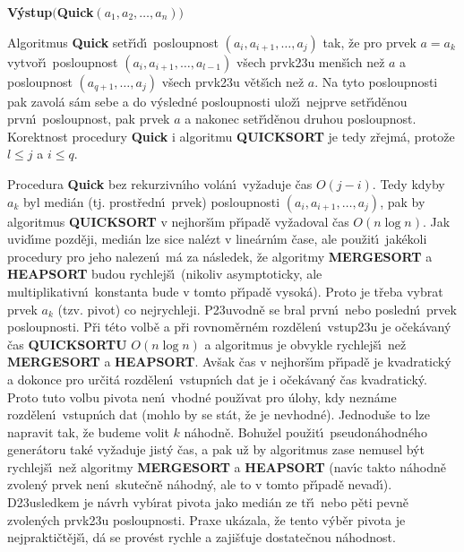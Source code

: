 \documentclass[a4paper,12pt]{article}
\begin{document}
{\bf V\'ystup$($Quick$(a_1,a_2,\dots,a_n))$
\bigskip

}\flushpar Algoritmus {\bf Quick} set\v r\'\i d\'\i\ posloupnost 
$(a_i,a_{i+1},\dots,a_j)$ tak, \v ze pro prvek $a=a_k$ vytvo\v r\'\i\ posloupnost 
$(a_i,a_{i+1},\dots,a_{l-1})$ v\v sech prvk\accent23u men\v s\'\i ch ne\v z $
a$ 
a posloupnost
$(a_{q+1},\dots,a_j)$ v\v sech prvk\accent23u 
v\v et\v s\'\i ch ne\v z $a$. Na tyto posloupnosti pak 
zavol\'a s\'am sebe a do v\'ysledn\'e posloupnosti ulo\v z\'\i\ 
nejprve set\v r\'\i d\v enou prvn\'\i\ posloupnost, pak prvek $a$ a nakonec 
set\v r\'\i d\v enou druhou posloupnost. Korektnost procedury 
{\bf Quick}  i algoritmu {\bf QUICKSORT} je tedy z\v rejm\'a, proto\v ze 
$l\le j$ a $i\le q$. 
\medskip

\flushpar Procedura {\bf Quick} bez rekurzivn\'\i ho vol\'an\'\i\ 
vy\v zaduje \v cas $O(j-i)$. Tedy kdyby $a_k$ byl medi\'an (tj. 
prost\v redn\'\i\ prvek) posloupnosti $(a_i,a_{i+1},\dots,a_j)$, pak 
by algoritmus {\bf QUICKSORT} v nejhor\v s\'\i m p\v r\'\i pad\v e vy\-\v zadoval \v cas $
O(n\log n)$. Jak 
uvid\'\i me pozd\v eji, medi\'an lze sice nal\'ezt v line\'ar\-n\'\i m \v case, ale 
pou\v zit\'\i\ jak\'ekoli procedury pro jeho nalezen\'\i\ m\'a za 
n\'asledek, \v ze algoritmy {\bf MERGESORT} a {\bf HEAPSORT }
budou rychlej\v s\'\i\ (nikoliv asymptoticky, ale 
multiplikativn\'\i\ konstanta bude v tomto p\v r\'\i pad\v e vysok\'a). Proto je t\v reba 
vybrat prvek $a_k$ (tzv. pivot) co 
nejrychleji. P\accent23uvodn\v e se bral prvn\'\i\ nebo 
posledn\'\i\ prvek posloupnosti. P\v ri t\'eto volb\v e a p\v ri 
rovnom\v ern\'em rozd\v elen\'\i\ vstup\accent23u je 
o\v cek\'avan\'y \v cas {\bf QUICKSORTU} $O(n\log n)$ a algoritmus je 
obvykle rychlej\v s\'\i\ ne\v z {\bf MERGESORT} a 
{\bf HEAPSORT}. Av\v sak \v cas v nejhor\v s\'\i m p\v r\'\i pad\v e je 
kvadratick\'y a dokonce pro ur\v cit\'a rozd\v elen\'\i\ vstupn\'\i ch dat 
je i o\v cek\'avan\'y \v cas kvadratick\'y. 
Proto tuto volbu pivota nen\'\i\ vhodn\'e pou\v z\'\i vat pro \'ulohy, kdy 
nezn\'ame rozd\v elen\'\i\ vstupn\'\i ch dat (mohlo by se st\'at, \v ze je 
nevhodn\'e). Jednodu\v se to lze napravit tak, \v ze budeme volit $
k$ n\'ahodn\v e. Bohu\v zel 
pou\v zit\'\i\ pseudon\'ahodn\'eho gener\'atoru tak\'e vy\v zaduje jist\'y \v cas, a pak 
u\v z by algoritmus zase nemusel b\'yt rychlej\v s\'\i\ ne\v z algoritmy 
{\bf MERGESORT} a {\bf HEAPSORT} (nav\'\i c takto n\'ahodn\v e zvolen\'y 
prvek nen\'\i\ skute\v cn\v e n\'ahodn\'y, ale to v tomto p\v r\'\i pad\v e 
nevad\'\i ). D\accent23usledkem je n\'avrh vyb\'\i rat pivota jako 
medi\'an ze t\v r\'\i\ nebo p\v eti pevn\v e zvolen\'ych prvk\accent23u 
posloupnosti. Praxe uk\'azala, \v ze tento v\'yb\v er pivota je 
nej\-prakti\v ct\v ej\v s\'\i , d\'a se prov\'est rychle a zaji\v s\v tuje 
dostate\v cnou n\'a\-hod\-nost.
\medskip
\end{document}
